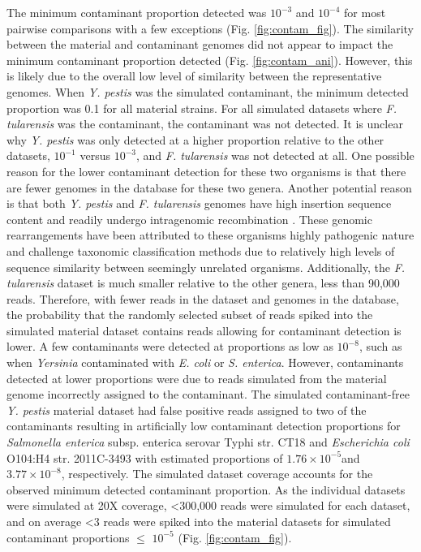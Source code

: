 \documentclass[fleqn,10pt,lineno]{wlpeerj}\usepackage[]{graphicx}\usepackage[]{color}
\begin{document}
The minimum contaminant proportion detected was $10^{-3}$ and  $10^{-4}$ for most pairwise comparisons with a few exceptions (Fig. \ref{fig:contam_fig}). 
The similarity between the material and contaminant genomes did not appear to impact the minimum contaminant proportion detected (Fig. \ref{fig:contam_ani}). 
However, this is likely due to the overall low level of similarity between the representative genomes. 
When \textit{Y. pestis} was the simulated contaminant, the minimum detected proportion was 0.1 for all material strains.
For all simulated datasets where \textit{F. tularensis} was the contaminant, the contaminant was not detected. 
It is unclear why \textit{Y. pestis} was only detected at a higher proportion relative to the other datasets, $10^{-1}$ versus $10^{-3}$, and \textit{F. tularensis} was not detected at all.
One possible reason for the lower contaminant detection for these two organisms is that there are fewer genomes in the database for these two genera. 
Another potential reason is that both \textit{Y. pestis} and \textit{F. tularensis} genomes have high insertion sequence content and readily undergo intragenomic recombination \citep{larsson2005complete,chain2004insights}. 
These genomic rearrangements have been attributed to these organisms highly pathogenic nature and challenge taxonomic classification methods due to relatively high levels of sequence similarity between seemingly unrelated organisms. 
Additionally, the \textit{F. tularensis} dataset is much smaller relative to the other genera, less than 90,000 reads. 
Therefore, with fewer reads in the dataset and genomes in the database, the probability that the randomly selected subset of reads spiked into the simulated material dataset contains reads allowing for contaminant detection is lower. 
A few contaminants were detected at proportions as low as $10^{-8}$, such as when \textit{Yersinia} contaminated with \textit{E. coli} or \textit{S. enterica}.
However, contaminants detected at lower proportions were due to reads simulated from the material genome incorrectly assigned to the contaminant.
The simulated contaminant-free \textit{Y. pestis} material dataset had false positive reads assigned to two of the contaminants resulting in artificially low contaminant detection proportions for \textit{Salmonella enterica} subsp. {enterica} serovar Typhi str. CT18 and \textit{Escherichia coli} O104:H4 str. 2011C-3493 with estimated proportions of \ensuremath{1.76\times 10^{-5}}and \ensuremath{3.77\times 10^{-8}}, respectively. 
The simulated dataset coverage accounts for the observed minimum detected contaminant proportion.
As the individual datasets were simulated at 20X coverage, \textless 300,000 reads were simulated for each dataset, and on average \textless 3 reads were spiked into the material datasets for simulated contaminant proportions $\leq$ $10^{-5}$ (Fig. \ref{fig:contam_fig}).
\end{document}
